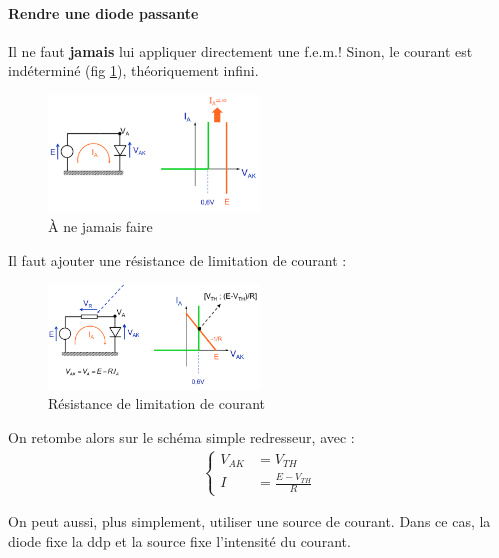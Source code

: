 \documentclass[a4paper]{article}
\begin{document}
    \paragraph{Rendre une diode passante}
    Il ne faut \textbf{jamais} lui appliquer directement une f.e.m.! Sinon, 
    le courant est indéterminé (fig \ref{fig:5_diodefem}), théoriquement infini.
    \begin{figure}[H]
        \begin{center}
            \includegraphics[width=0.5\textwidth]{fig/5_diodefem.png}
            \caption{\`A ne jamais faire}
            \label{fig:5_diodefem}
        \end{center}
    \end{figure}

    Il faut ajouter une résistance de limitation de courant :
    \begin{figure}[H]
        \begin{center}
            \includegraphics[width=0.5\textwidth]{fig/5_resistancelimitation.png}
            \caption{Résistance de limitation de courant}
            \label{fig:5_resistancelimitation}
        \end{center}
    \end{figure}
    On retombe alors sur le schéma simple redresseur, avec :
    \begin{align*}
        \begin{cases}
            V_{AK} &= V_{TH}\\
            I &=\frac{E-V_{TH}}{R}
        \end{cases}
    \end{align*}

    On peut aussi, plus simplement, utiliser une source de courant. Dans ce cas, 
    la diode fixe la ddp et la source fixe l'intensité du courant.
\end{document}
